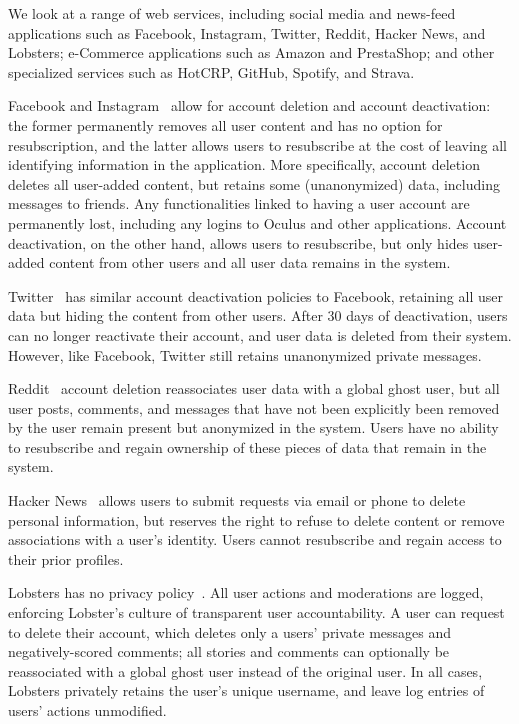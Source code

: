 We look at a range of web services, including social media and news-feed applications such as
Facebook, Instagram, Twitter, Reddit, Hacker News, and Lobsters; e-Commerce applications such as
Amazon and PrestaShop; and other specialized services such as HotCRP, GitHub, Spotify, and Strava.


Facebook and Instagram~\cite{facebook:privacy} allow for account deletion and account deactivation:
the former permanently removes all user content and has no option for resubscription, and the latter
allows users to resubscribe at the cost of leaving all identifying information in the application.
More specifically, account deletion deletes all user-added content, but retains some (unanonymized)
data, including messages to friends. Any functionalities linked to having a user account are permanently lost,
including any logins to Oculus and other applications. Account deactivation, on the other hand,
allows users to resubscribe, but only hides user-added content from other users and all user data
remains in the system. 

Twitter~\cite{twitter:privacy} has similar account deactivation policies to Facebook, retaining all
user data but hiding the content from other users. After 30 days of deactivation, users can no
longer reactivate their account, and user data is deleted from their system.  However, like
Facebook, Twitter still retains unanonymized private messages.

Reddit~\cite{reddit:privacy} account deletion reassociates user data with a global ghost user, but
all user posts, comments, and messages that have not been explicitly been removed by the user remain
present but anonymized in the system. Users have no ability to resubscribe and regain
ownership of these pieces of data that remain in the system. 

Hacker News~\cite{hackernews:privacy} allows users to submit requests via email or phone to delete
personal information, but reserves the right to refuse to delete content or remove associations with
a user's identity.  Users cannot resubscribe and regain access to their prior profiles.

Lobsters has no privacy policy~\cite{lobsters:privacy}. All user actions and moderations are
logged, enforcing Lobster's culture of transparent user accountability. A user can request to delete
their account, which deletes only a users' private messages and negatively-scored comments; all
stories and comments can optionally be reassociated with a global ghost user instead of the original
user. In all cases, Lobsters privately retains the user's unique username, and leave log entries of users'
actions unmodified.

